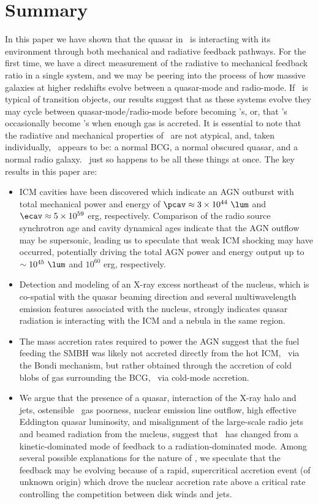 \documentclass[useAMS,usenatbib]{mn2e}
\begin{document}
\section{Summary}
\label{sec:summ}

In this paper we have shown that the quasar in \inine\ is interacting
with its environment through both mechanical and radiative feedback
pathways. For the first time, we have a direct measurement of the
radiative to mechanical feedback ratio in a single system, and we may
be peering into the process of how massive galaxies at higher
redshifts evolve between a quasar-mode and radio-mode. If \irs\ is
typical of transition objects, our results suggest that as these
systems evolve they may cycle between quasar-mode/radio-mode before
becoming \fri's, or, that \fri's occasionally become \frii's when
enough gas is accreted. It is essential to note that the radiative and
mechanical properties of \irs\ are not atypical, and, taken
individually, \irs\ appears to be: a normal BCG, a normal obscured
quasar, and a normal radio galaxy. \irs\ just so happens to be all
these things at once. The key results in this paper are:
\begin{itemize}
\item ICM cavities have been discovered which indicate an AGN outburst
  with total mechanical power and energy of $\pcav \approx 3 \times
  10^{44} ~\lum$ and $\ecav \approx 5 \times 10^{59}$ erg,
  respectively. Comparison of the radio source synchrotron age and
  cavity dynamical ages indicate that the AGN outflow may be
  supersonic, leading us to speculate that weak ICM shocking may have
  occurred, potentially driving the total AGN power and energy output
  up to $\sim 10^{45} ~\lum$ and $10^{60}$ erg, respectively.
\item Detection and modeling of an X-ray excess northeast of the
  nucleus, which is co-spatial with the quasar beaming direction and
  several multiwavelength emission features associated with the
  nucleus, strongly indicates quasar radiation is interacting with the
  ICM and a nebula in the same region.
\item The mass accretion rates required to power the AGN suggest that
  the fuel feeding the SMBH was likely not accreted directly from the
  hot ICM, \ie\ via the Bondi mechanism, but rather obtained through
  the accretion of cold blobs of gas surrounding the BCG, \ie\ via
  cold-mode accretion.
\item We argue that the presence of a quasar, interaction of the X-ray
  halo and jets, ostensible \irs\ gas poorness, nuclear emission line
  outflow, high effective Eddington quasar luminosity, and
  misalignment of the large-scale radio jets and beamed radiation from
  the nucleus, suggest that \irs\ has changed from a kinetic-dominated
  mode of feedback to a radiation-dominated mode. Among several
  possible explanations for the nature of \irs, we speculate that the
  feedback may be evolving because of a rapid, supercritical accretion
  event (of unknown origin) which drove the nuclear accretion rate
  above a critical rate controlling the competition between disk winds
  and jets.
\end{itemize}
\end{document}
